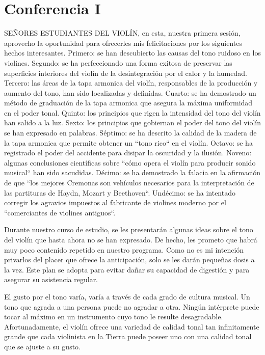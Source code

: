 \chapter*{Conferencia I}
SEÑORES ESTUDIANTES DEL VIOLÍN, en esta, nuestra primera sesión, aprovecho la oportunidad para ofrecerles mis felicitaciones por los siguientes hechos interesantes. Primero: se han descubierto las causas del tono ruidoso en los violines. Segundo: se ha perfeccionado una forma exitosa de preservar las superficies interiores del violín de la desintegración por el calor y la humedad. Tercero: las áreas de la tapa armonica del violín, responsables de la producción y aumento del tono, han sido localizadas y definidas. Cuarto: se ha demostrado un método de graduación de la tapa armonica que asegura la máxima uniformidad en el poder tonal. Quinto: los principios que rigen la intensidad del tono del violín han salido a la luz. Sexto: los principios que gobiernan el poder del tono del violín se han expresado en palabras. Séptimo: se ha descrito la calidad de la madera de la tapa armonica que permite obtener un ``tono rico`` en el violín. Octavo: se ha registrado el poder del accidente para disipar la oscuridad y la ilusión. Noveno: algunas conclusiones científicas sobre ``cómo opera el violín para producir sonido musical`` han sido sacudidas. Décimo: se ha demostrado la falacia en la afirmación de que ``los mejores Cremonas son vehículos necesarios para la interpretación de las partituras de Haydn, Mozart y Beethoven``. Undécimo: se ha intentado corregir los agravios impuestos al fabricante de violines moderno por el ``comerciantes de violines antiguos``.

Durante nuestro curso de estudio, se les presentarán algunas ideas sobre el tono del violín que hasta ahora no se han expresado. De hecho, les prometo que habrá muy poco contenido repetido en nuestro programa. Como no es mi intención privarlos del placer que ofrece la anticipación, solo se les darán pequeñas dosis a la vez. Este plan se adopta para evitar dañar su capacidad de digestión y para asegurar su asistencia regular.

El gusto por el tono varía, varía a través de cada grado de cultura musical. Un tono que agrada a una persona puede no agradar a otra. Ningún intérprete puede tocar al máximo en un instrumento cuyo tono le resulte desagradable. Afortunadamente, el violín ofrece una variedad de calidad tonal tan infinitamente grande que cada violinista en la Tierra puede poseer uno con una calidad tonal que se ajuste a su gusto.

